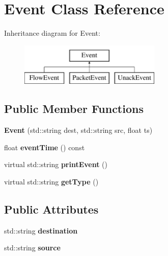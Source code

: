 \hypertarget{classEvent}{\section{\-Event \-Class \-Reference}
\label{classEvent}
}
\-Inheritance diagram for \-Event\-:\begin{figure}[H]
\begin{center}
\leavevmode
\includegraphics[height=2.000000cm]{classEvent}
\end{center}
\end{figure}
\subsection*{\-Public \-Member \-Functions}
\begin{DoxyCompactItemize}
\item 
\hypertarget{classEvent_acf52761e903e33d30275c4f0a7800316}{{\bfseries \-Event} (std\-::string dest, std\-::string src, float ts)}\label{classEvent_acf52761e903e33d30275c4f0a7800316}

\item 
\hypertarget{classEvent_aeef24383baad6cba356ed7801d0e27ce}{float {\bfseries event\-Time} () const }\label{classEvent_aeef24383baad6cba356ed7801d0e27ce}

\item 
\hypertarget{classEvent_a20da5a96724238c0afb4a9b27574400f}{virtual std\-::string {\bfseries print\-Event} ()}\label{classEvent_a20da5a96724238c0afb4a9b27574400f}

\item 
\hypertarget{classEvent_a3e3dfee48cea1b42321adae3c51f82e2}{virtual std\-::string {\bfseries get\-Type} ()}\label{classEvent_a3e3dfee48cea1b42321adae3c51f82e2}

\end{DoxyCompactItemize}
\subsection*{\-Public \-Attributes}
\begin{DoxyCompactItemize}
\item 
\hypertarget{classEvent_aa28be1a89b2516ea9f570ff619f754bc}{std\-::string {\bfseries destination}}\label{classEvent_aa28be1a89b2516ea9f570ff619f754bc}

\item 
\hypertarget{classEvent_abc9c246c173d3433d2ffc0a4ed35bc01}{std\-::string {\bfseries source}}\label{classEvent_abc9c246c173d3433d2ffc0a4ed35bc01}

\end{DoxyCompactItemize}
